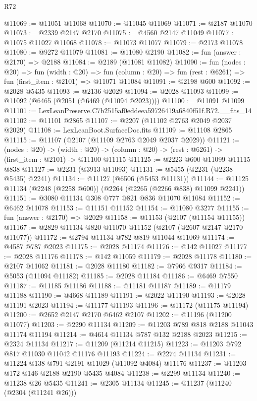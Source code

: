 \begin{lexlean}{R72}
\begin{coremodule}
@11069 := @11051 @11068
@11070 := @11045 @11069
@11071 := @2187 @11070
@11073 := @2339 @2147 @2170
@11075 := @4560 @2147 @11049
@11077 := @11075 @11027 @11068
@11078 := @11073 @11077
@11079 := @2173 @11078
@11080 := @9272 @11079
@11081 := @11080 @2190
@11082 := fun (answer : @2170) => @2188
@11084 := @2189 (@11081 @11082)
@11090 := fun (nodes : @20) =>
  fun (width : @20) =>
  fun (column : @20) => fun (rest : @6261) => fun (first_item : @2101) => @11071 @11084
@11091 := @2198 @600
@11092 := @2028 @5435
@11093 := @2136 @2029
@11094 := @2028 @11093
@11099 := @11092 (@6465 (@2051 (@6469 (@11094 @2023))))
@11100 := @11091 @11099
@11101 := LexLeanPreserve.C7b2515af0eddeea59726419a6840f51f.R72.__fits_14
@11102 := @11101 @2865
@11107 := @2207 (@11102 @2763 @2049 @2037 @2029)
@11108 := LexLeanBoot.SurfaceDoc.fits
@11109 := @11108 @2865
@11115 := @11107 (@2107 (@11109 @2763 @2049 @2037 @2029))
@11121 := (nodes : @20) ->
  (width : @20) -> (column : @20) -> (rest : @6261) -> (first_item : @2101) -> @11100 @11115
@11125 := @2223 @600 @11099 @11115 @838
@11127 := @2231 (@3913 @11093)
@11131 := @5455 (@2231 (@2238 @5435) @2241)
@11134 := @11127 (@6506 (@5453 @11131))
@11144 := @11125 @11134 (@2248 (@2258 @600)) (@2264 (@2265 (@2266 @838) @11099 @2241))
@11151 := @3080 @11134 @308 @777 @821 @836 @11070 @11084
@11152 := @6462 @11078
@11153 := @11151 @11152
@11154 := @11080 @3277
@11155 := fun (answer : @2170) => @2029
@11158 := @11153 (@2107 (@11154 @11155))
@11167 := @2829 @11134 @820 @11070 @11152 (@2107 (@2607 @2147 @2170 @11077))
@11172 := @2794 @11134 @782 @819 @11044 @11069
@11174 := @4587 @787 @2023
@11175 := @2028 @11174
@11176 := @142 @11027
@11177 := @2028 @11176
@11178 := @142 @11059
@11179 := @2028 @11178
@11180 := @2107 @11062
@11181 := @2028 @11180
@11182 := @7966 @9317
@11184 := @5053 (@11094 @11182)
@11185 := @2028 @11184
@11186 := @6469 @7550
@11187 := @11185 @11186
@11188 := @11181 @11187
@11189 := @11179 @11188
@11190 := @4668 @11189
@11191 := @2022 @11190
@11193 := @2028 @11191 @2023
@11194 := @11177 @11193
@11196 := @11172 (@11175 @11194)
@11200 := @2652 @2147 @2170 @6462 @2107
@11202 := @11196 (@11200 @11077)
@11203 := @2290 @11134
@11209 := @11203 @789 @818 @2188 @11043 @11174 @11194
@11214 := @4614 @11134 @787 @132 @2188 @2023
@11215 := @2324 @11134
@11217 := @11209 (@11214 @11215)
@11223 := @11203 @792 @817 @11030 @11042 @11176 @11193
@11224 := @2274 @11134
@11231 := @11224 @138 @791 @2191 @11029 (@11092 @4084) @11176
@11237 := @11203 @172 @146 @2188 @2190 @5435 @4084
@11238 := @2299 @11134
@11240 := @11238 @26 @5435
@11241 := @2305 @11134
@11245 := @11237 (@11240 (@2304 (@11241 @26)))

\end{coremodule}
\end{lexlean}
